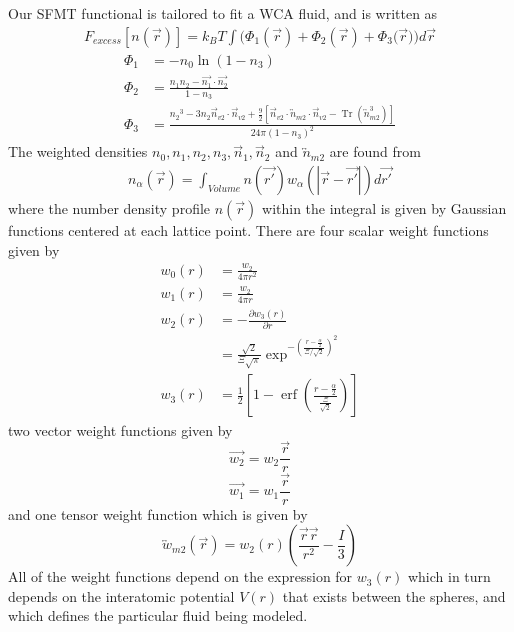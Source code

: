 \documentclass[double,12pt]{beavtex}
\begin{document}
Our SFMT functional is tailored to fit a WCA fluid, and 
is written as 
\begin{align}\label{eq:Fexfunctional}
  F_{excess}[n(\vec{r})]=k_BT\int(\Phi_1(\vec{r})+\Phi_2(\vec{r})+\Phi_3(\vec{r}{)) d}\vec{r}
\end{align}
\begin{align}
\Phi_1 &= -n_{0}\ln(1-n_{3}) \\
\Phi_2 &= \frac{n_{1}n_{2}-\vec{n_{1}}\cdot\vec{n_{2}}}{1-n_{3}} \\
\Phi_3 &= \frac{{n_2}^3-3n_2\vec{n}_{v2}\cdot\vec{n}_{v2}+\frac{9}{2}[\vec{n}_{v2}\cdot{\overleftrightarrow{n}_{m2}}\cdot{\vec{n}_{v2}}-\operatorname{Tr}({\overleftrightarrow{n}^3_{m2}})]}{24\pi(1-n_3)^2}  
\end{align} 
The weighted densities $n_0, n_1, n_2, n_3, \vec {n}_1, \vec {n}_2$ and $\overleftrightarrow{n}_{m2}$ are found from
\begin{align}\label{eq:numdenprofile}
	n_\alpha(\vec{r})=\int_{Volume}{n(\vec{r'})w_\alpha(|\vec{r}-\vec{r'}|)d{\vec{r'}}}
\end{align}
where the number density profile $n(\vec r)$ within the integral is given 
by Gaussian functions centered at each lattice point.
There are four scalar weight functions given by
\begin{align}\label{eq:weights}
  w_{0}(r) &=\frac{w_{2}}{4\pi{r}^2} \\
  w_{1}(r) &=\frac{w_{2}}{4\pi{r}} \\
  w_2(r) &=-\frac{\partial{w_3(r)}}{\partial{r}} \\
  &= \frac{\sqrt{2}}{\Xi\sqrt\pi}\exp^{-\left(\frac{r-\frac{\alpha}{2}}{\Xi/\sqrt{2}}\right)^2}  \\
  w_3(r) &=\frac{1}{2}\left[1-\operatorname{erf}\left(\frac{r-\frac{\alpha}{2}}{\frac{\Xi}{\sqrt{2}}}\right)\right]  
\end{align}
two vector weight functions given by 
\begin{equation}\label{eq:w_v2}{  \vec{w_{2}}=w_{2}\frac{\vec{r}}{r}  }\end{equation}
\begin{equation}\label{eq:w_v1}{  \vec{w_{1}}=w_{1}\frac{\vec{r}}{r}  }\end{equation} 
and one tensor weight function which is given by
\begin{equation}\label{eq:tensorweight-methods}\overleftrightarrow{w}_{m2}(\vec{r}) = w_2(r)\left(\frac{\vec{r}\vec{r}}{r^2}-\frac{I}{3}\right)\end{equation}
All of the weight functions depend on the expression for $w_3(r)$ 
which in turn depends on the interatomic potential $V(r)$ that exists 
between the spheres, and which defines the particular fluid being modeled.
\end{document}
